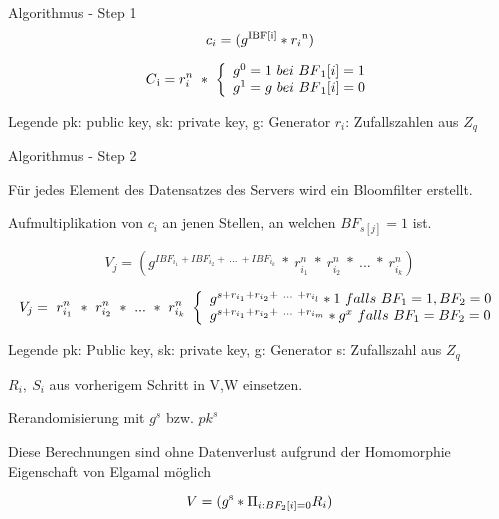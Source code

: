 \documentclass{beamer}
\begin{document}
	\begin{frame}{Algorithmus - Step 1}
		$$c_i = (g \textsuperscript{IBF[i]}  * r_{i}\textsuperscript{n})$$
		
		
		\[
		C\textsubscript{i} = r_{i}^{n} \ * \ \left\{
		\begin{array}{ll}
		g^{0} = 1 \ bei \  BF\textsubscript{1}[i]=1\\
		g^{1} = g \ bei \ BF\textsubscript{1}[i]=0\\
		\end{array}
		\right.
		\]
		
		\begin{block}{Legende}
			pk: public key, sk: private key, g: Generator $r_i$: Zufallszahlen aus $Z_q$ 
		\end{block}
		
	\end{frame}
	
	\begin{frame}{Algorithmus - Step 2}
		
		\begin{arrowlist}
			\item Für jedes Element des Datensatzes des Servers wird ein Bloomfilter erstellt.
			\item Aufmultiplikation  von $c_i$  an jenen Stellen, an welchen $BF_{s[j]}= 1$ ist.
		\end{arrowlist}
		
		
			$$ V_{j} = (g^{ IBF_{i_{1}} + IBF_{i_{2}} + \ ...\ +IBF_{i_{k}}} \ * \ r_{i_{1}}^{n} \ * \ r_{i_{2}}^{n} \ * \ ...\ * \  r_{i_{k}}^{n})$$
			
			\[
			V_{j} = \ r_{i_{1}}^{n} \ * \ r_{i_{2}}^{n} \ * \ ...\ * \  r_{i_{k}}^{n} \* \ \left\{
			\begin{array}{ll}
			g^{s + r_{i_{1}} + r_{i_{2}} + \ ...\ +r_{i_{l}}}*1 \ falls \ BF_{1} = 1,BF_{2} = 0 \\
			g^{s + r_{i_{1}} + r_{i_{2}} + \ ...\ +r_{i_{m}}}*g^{x} \ falls \ BF_{1} = BF_{2} = 0\\
			\end{array}
			\right.
			\]
			
			
			\begin{block}{Legende}
				pk: Public key, sk: private key, g: Generator s: Zufallszahl aus $Z_q$
			\end{block}
			
		\end{frame}
	
	\begin{frame}
		
		\begin{arrowlist}
			\item 	 $R_{i}, \  S_{i}$ aus vorherigem Schritt in V,W einsetzen.
			\item Rerandomisierung mit $g^s$ bzw. $pk^s$ 
			\item Diese Berechnungen sind ohne Datenverlust aufgrund der Homomorphie Eigenschaft von Elgamal möglich
		\end{arrowlist}	
		$$ V = (g \textsuperscript{s} * \Pi_{i:BF_{2}[i] = 0} R_{i} )$$
	\end{frame}
\end{document}
